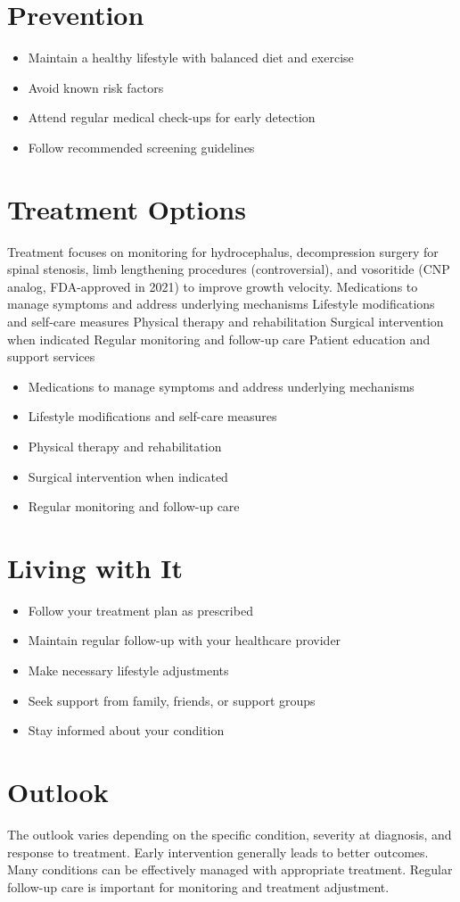 \section{Prevention}
\begin{itemize}[noitemsep]
  \item Maintain a healthy lifestyle with balanced diet and exercise
  \item Avoid known risk factors
  \item Attend regular medical check-ups for early detection
  \item Follow recommended screening guidelines
\end{itemize}
\section{Treatment Options}
Treatment focuses on monitoring for hydrocephalus, decompression surgery for spinal stenosis, limb lengthening procedures (controversial), and vosoritide (CNP analog, FDA-approved in 2021) to improve growth velocity. Medications to manage symptoms and address underlying mechanisms Lifestyle modifications and self-care measures Physical therapy and rehabilitation Surgical intervention when indicated Regular monitoring and follow-up care Patient education and support services

\begin{itemize}[noitemsep]
  \item Medications to manage symptoms and address underlying mechanisms
  \item Lifestyle modifications and self-care measures
  \item Physical therapy and rehabilitation
  \item Surgical intervention when indicated
  \item Regular monitoring and follow-up care
\end{itemize}
\section{Living with It}
\begin{itemize}[noitemsep]
  \item Follow your treatment plan as prescribed
  \item Maintain regular follow-up with your healthcare provider
  \item Make necessary lifestyle adjustments
  \item Seek support from family, friends, or support groups
  \item Stay informed about your condition
\end{itemize}
\section{Outlook}
The outlook varies depending on the specific condition, severity at diagnosis, and response to treatment. Early intervention generally leads to better outcomes. Many conditions can be effectively managed with appropriate treatment. Regular follow-up care is important for monitoring and treatment adjustment.

